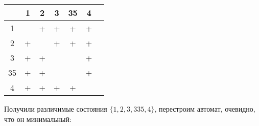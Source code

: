 \documentclass{article}
\begin{document}
\begin{enumerate}
\begin{center}
\begin{tabular}{ |c||c|c|c|c|c|c| }
                \hline
                  & 1 & 2 & 3 & 35 & 4 \\
                \hline\hline
                1  &   & + & + & + & + \\
                \hline
                2  & + &  & + & + & + \\
                \hline
                3  & + & + &  &  & + \\
                \hline
                35 & + & + &  &  & + \\
                \hline
                4 & + & + & + & + &  \\
                \hline
            \end{tabular}
        \end{center}
        Получили различимые состояния \(\{1, 2, 3, 335, 4\}\), перестроим автомат, очевидно, что он минимальный:
        \begin{center}
        \end{center}
        

\end{enumerate}
\end{document}
